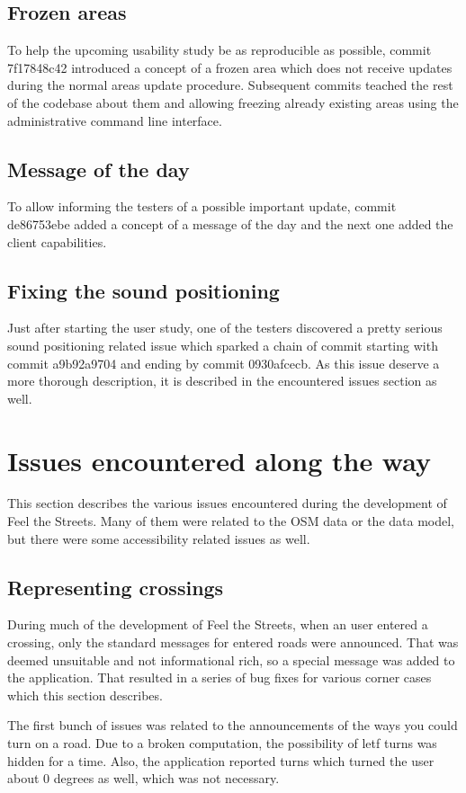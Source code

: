 \documentclass[nolof,digital]{fithesis3}
\begin{document}
\subsection{Frozen areas}
To help the upcoming usability study be as reproducible as possible, commit 7f17848c42 introduced a concept of a frozen area which does not receive updates during the normal areas update procedure. Subsequent commits teached the rest of the codebase about them and allowing freezing already existing areas using the administrative command line interface.
\subsection{Message of the day}
To allow informing the testers of a possible important update, commit de86753ebe added a concept of a message of the day and the next one added the client capabilities.
\subsection{Fixing the sound positioning}
Just after starting the user study, one of the testers discovered a pretty serious sound positioning related issue which sparked a chain of commit starting with commit a9b92a9704 and ending by commit 0930afcecb. As this issue deserve a more thorough description, it is described in the encountered issues section as well.
\section{Issues encountered along the way}
This section describes the various issues encountered during the development of Feel the Streets. Many of them were related to the OSM data or the data model, but there were some accessibility related issues as well.
\subsection{Representing crossings}
During much of the development of Feel the Streets, when an user entered a crossing, only the standard messages for entered roads were announced. That was deemed unsuitable and not informational rich, so a special message was added to the application. That resulted in a series of bug fixes for various corner cases which this section describes.

The first bunch of issues was related to the announcements of the ways you could turn on a road. Due to a broken computation, the possibility of letf turns was hidden for a time. Also, the application reported turns which turned the user about 0 degrees as well, which was not necessary.
\end{document}

